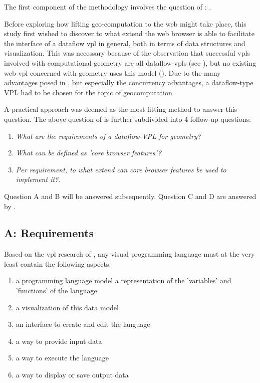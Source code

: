 The first component of the methodology involves the question of \mySubRQOneTitle : \mySubRQOne.

Before exploring how lifting geo-computation to the web might take place, this study first wished to discover to what extend the web browser is able to facilitate the interface of a dataflow vpl in general, both in terms of data structures and visualization. 
This was necessary because of the observation that successful vpls involved with computational geometry are all dataflow-vpls (see ), but no existing web-vpl concerned with geometry uses this model ().
Due to the many advantages posed in , but especially the concurrency advantages, a dataflow-type VPL had to be chosen for the topic of geocomputation.

A practical approach was deemed as the most fitting method to answer this question.
The above question of \mySubRQOneTitle is further subdivided into 4 follow-up questions:
\begin{enumerate}[A]
  \item \emph{What are the requirements of a dataflow-VPL for geometry?}
  \item \emph{What can be defined as 'core browser features'?}
  \item \emph{Per requirement, to what extend can core browser features be used to implement it?}.
\end{enumerate}

Question A and B will be answered subsequently. 
Question C and D are answered by .

\subsection*{A: Requirements}

Based on the vpl research of , any visual programming language must at the very least contain the following aspects: 
\begin{enumerate}[-]
  \item a programming language model
  \subitem a representation of the 'variables' and 'functions' of the language
  \item a visualization of this data model
  \item an interface to create and edit the language 
  \item a way to provide input data 
  \item a way to execute the language
  \item a way to display or save output data
\end{enumerate}


